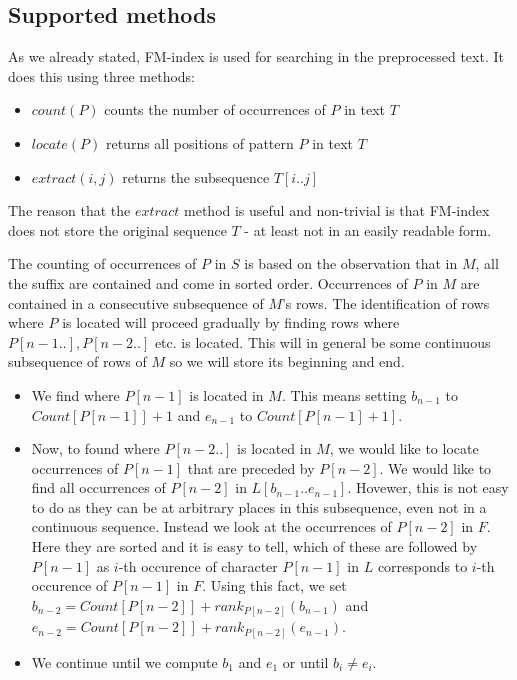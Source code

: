 \subsection{Supported methods}

As we already stated, FM-index is used for searching in the preprocessed text.
It does this using three methods:

\begin{itemize}
	\item $count(P)$ counts the number of occurrences of $P$ in text $T$
	\item $locate(P)$ returns all positions of pattern $P$ in text $T$
	\item $extract(i, j)$ returns the subsequence $T[i..j]$
\end{itemize}

The reason that the $extract$ method is useful and non-trivial is that FM-index
does not store the original sequence $T$ - at least not in an easily readable form.

The counting of occurrences of $P$ in $S$ is based on the observation that in $M$,
all the suffix are contained and come in sorted order. Occurrences of $P$ in $M$
are contained in a consecutive subsequence of $M$'s rows. The identification of
rows where $P$ is located will proceed gradually by finding rows where $P[n-1..],
P[n-2..]$ etc. is located. This will in general be some continuous subsequence of
rows of $M$ so we will store its beginning and end.

\begin{itemize}
	\item We find where $P[n-1]$ is located in $M$. This means setting $b_{n-1}$ to
	$Count[P[n-1]]+1$ and $e_{n-1}$ to $Count[P[n-1]+1]$.
	\item Now, to found where $P[n-2..]$ is located in $M$, we would like to locate
	occurrences of $P[n-1]$ that are preceded by $P[n-2]$. We would like to find all
	occurrences of $P[n-2]$ in $L[b_{n-1}..e_{n-1}]$. Hovewer, this is not easy to do
	as they can be at arbitrary places in this subsequence, even not in a continuous
	sequence. Instead we look at the occurrences of $P[n-2]$ in $F$. Here they are
	sorted and it is easy to tell, which of these are followed by $P[n-1]$ as $i$-th
	occurence of character $P[n-1]$ in $L$ corresponds to $i$-th occurence of $P[n-1]$
	in $F$. Using this fact, we set
	$b_{n-2} = Count[P[n-2]] + rank_{P[n-2]}(b_{n-1})$ and
	$e_{n-2} = Count[P[n-2]] + rank_{P[n-2]}(e_{n-1})$.
	\item We continue until we compute $b_1$ and $e_1$ or until $b_i\neq e_i$.
\end{itemize}

